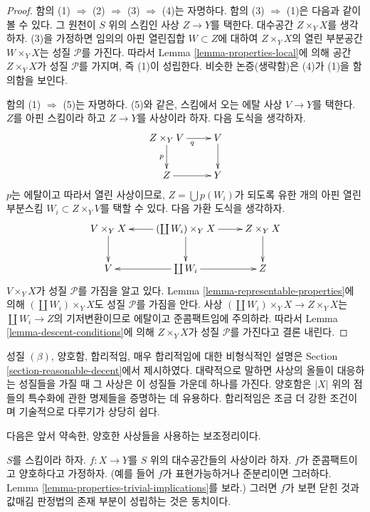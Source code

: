 \begin{proof}
함의 (1) $\Rightarrow$ (2) $\Rightarrow$ (3) $\Rightarrow$ (4)는
자명하다. 함의 (3) $\Rightarrow$ (1)은 다음과 같이 볼 수 있다.
그 원천이 $S$ 위의 스킴인 사상 $Z \to Y$를 택한다. 대수공간
$Z \times_Y X$를 생각하자. (3)을 가정하면 임의의 아핀 열린집합
$W \subset Z$에 대하여 $Z \times_Y X$의 열린 부분공간
$W \times_Y X$는 성질 $\mathcal{P}$를 가진다. 따라서 Lemma
\ref{lemma-properties-local}에 의해 공간 $Z \times_Y X$가 성질
$\mathcal{P}$를 가지며, 즉 (1)이 성립한다. 비슷한 논증(생략함)은
(4)가 (1)을 함의함을 보인다.

\medskip\noindent
함의 (1) $\Rightarrow$ (5)는 자명하다. (5)와 같은, 스킴에서 오는
에탈 사상 $V \to Y$를 택한다. $Z$를 아핀 스킴이라 하고
$Z \to Y$를 사상이라 하자. 다음 도식을 생각하자.
$$
\xymatrix{
Z \times_Y V \ar[r]_q \ar[d]_p & V \ar[d] \\
Z \ar[r] & Y
}
$$
$p$는 에탈이고 따라서 열린 사상이므로, $Z = \bigcup p(W_i)$가 되도록
유한 개의 아핀 열린 부분스킴 $W_i \subset Z \times_Y V$를 택할 수
있다. 다음 가환 도식을 생각하자.
$$
\xymatrix{
V \times_Y X \ar[d] &
(\coprod W_i) \times_Y X \ar[l] \ar[d] \ar[r] &
Z \times_Y X \ar[d] \\
V &
\coprod W_i \ar[l] \ar[r] &
Z
}
$$
$V \times_Y X$가 성질 $\mathcal{P}$를 가짐을 알고 있다. Lemma
\ref{lemma-representable-properties}에 의해
$(\coprod W_i) \times_Y X$도 성질 $\mathcal{P}$를 가짐을 안다.
사상 $(\coprod W_i) \times_Y X \to Z \times_Y X$는
$\coprod W_i \to Z$의 기저변환이므로 에탈이고 준콤팩트임에 주의하라.
따라서 Lemma \ref{lemma-descent-conditions}에 의해 $Z \times_Y X$가
성질 $\mathcal{P}$를 가진다고 결론 내린다.
\end{proof}

\begin{remark}
\label{remark-very-reasonable}
성질 $(\beta)$, 양호함, 합리적임, 매우 합리적임에 대한 비형식적인
설명은 Section \ref{section-reasonable-decent}에서 제시하였다.
대략적으로 말하면 사상의 올들이 대응하는 성질들을 가질 때 그 사상은
이 성질들 가운데 하나를 가진다. 양호함은 $|X|$ 위의 점들의 특수화에
관한 명제들을 증명하는 데 유용하다. 합리적임은 조금 더 강한 조건이며
기술적으로 다루기가 상당히 쉽다.
\end{remark}

\noindent
다음은 앞서 약속한, 양호한 사상들을 사용하는 보조정리이다.

\begin{lemma}
\label{lemma-re-characterize-universally-closed}
$S$를 스킴이라 하자.
$f : X \to Y$를 $S$ 위의 대수공간들의 사상이라 하자.
$f$가 준콤팩트이고 양호하다고 가정하자.
(예를 들어 $f$가 표현가능하거나 준분리이면 그러하다. Lemma
\ref{lemma-properties-trivial-implications}를 보라.)
그러면 $f$가 보편 닫힌 것과 값매김 판정법의 존재 부분이 성립하는 것은
동치이다.
\end{lemma}

